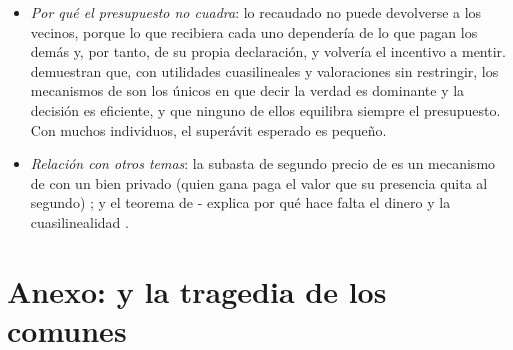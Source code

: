 \documentclass[11pt]{article}
\begin{document}
\begin{itemize}
\begin{itemize}
  \end{itemize}
\item \emph{Por qué el presupuesto no cuadra}: lo recaudado no puede devolverse a los vecinos, porque lo que recibiera cada uno dependería de lo que pagan los demás y, por tanto, de su propia declaración, y volvería el incentivo a mentir. \textcite{GreenLaffont1977Characterization} demuestran que, con utilidades cuasilineales y valoraciones sin restringir, los mecanismos de  son los únicos en que decir la verdad es dominante y la decisión es eficiente, y que ninguno de ellos equilibra siempre el presupuesto. Con muchos individuos, el superávit esperado es pequeño.
\item \emph{Relación con otros temas}: la subasta de segundo precio de \textcite{Vickrey1961Counterspeculation} es un mecanismo de  con un bien privado (quien gana paga el valor que su presencia quita al segundo) ; y el teorema de - explica por qué hace falta el dinero y la cuasilinealidad .
\end{itemize}

\section{Anexo:  y la tragedia de los comunes}\label{anexo:ostrom}
\end{document}
